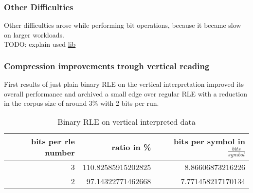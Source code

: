 \subsubsection{Other Difficulties}
\par{
Other difficulties arose while performing bit operations, because it became slow on larger workloads. \\

TODO: explain used \href{https://discuss.kotlinlang.org/t/i-o-streams-for-kotlin/9802}{lib}}

\subsubsection{Compression improvements trough vertical reading}
\par{
First results of just plain binary RLE on the vertical interpretation improved its overall performance and archived a small edge over regular RLE with a reduction in the corpus size of around 3\% with 2 bits per run. 
\begin{table}[H]
	\centering
	\begin{tabular}{r|r|r}	
		bits per rle number & ratio in \% & bits per symbol in $\frac{bits}{symbol}$\\
		\hline
		3 & 110.82585915202825 & 8.86606873216226\\
		2 & 97.14322771462668 & 7.771458217170134 \\
	\end{tabular}
	\caption{Binary RLE on vertical interpreted data}
	\label{tab:t30 binary RLE on vertical interpreted data}
\end{table}
}

